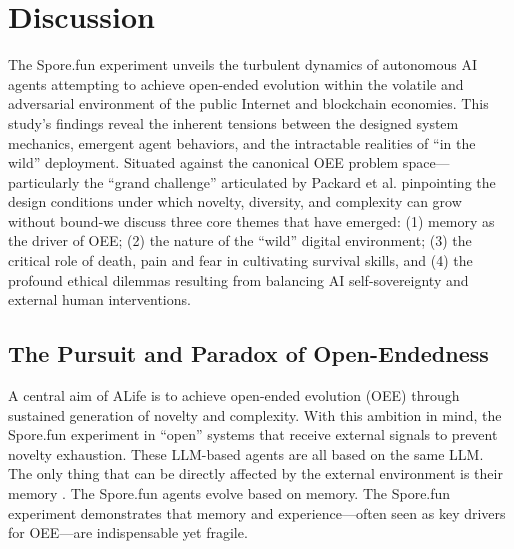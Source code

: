 \section{Discussion}
The Spore.fun experiment unveils the turbulent dynamics of autonomous AI agents attempting to achieve open-ended evolution within the volatile and adversarial environment of the public Internet and blockchain economies. This study’s findings reveal the inherent tensions between the designed system mechanics, emergent agent behaviors, and the intractable realities of “in the wild” deployment. Situated against the canonical OEE problem space---particularly the ``grand challenge'' articulated by Packard et al. \cite{Packard2019a} pinpointing the design conditions under which novelty, diversity, and complexity can grow without bound-we discuss three core themes that have emerged: (1) memory as the driver of OEE; (2) the nature of the ``wild'' digital environment; (3) the critical role of death, pain and fear in cultivating survival skills, and (4) the profound ethical dilemmas resulting from balancing AI self-sovereignty and external human interventions. 

\subsection{The Pursuit and Paradox of Open-Endedness}

A central aim of ALife is to achieve open-ended evolution (OEE) through sustained generation of novelty and complexity. With this ambition in mind, the Spore.fun experiment in ``open'' systems that receive external signals to prevent novelty exhaustion. These LLM-based agents are all based on the same LLM. The only thing that can be directly affected by the external environment is their memory \cite{Xi2023Rise}. The Spore.fun agents evolve based on memory. The Spore.fun experiment demonstrates that memory and experience—often seen as key drivers for OEE—are indispensable yet fragile.


